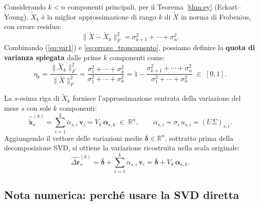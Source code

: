 \documentclass[11pt,a4paper]{article}
\theoremstyle{plain}
\theoremstyle{definition}
\theoremstyle{remark}
\begin{document}
Considerando $k < n$ componenti principali, per il Teorema~\ref{thm:ey}
(Eckart--Young), $\tilde{X}_k$ è la miglior
approssimazione di rango $k$ di $\tilde{X}$ in norma di Frobenius, con
errore residuo:
\begin{equation}
  \|\tilde{X} - \tilde{X}_k\|_F^2
  = \sigma_{k+1}^2 + \cdots + \sigma_n^2.
  \label{eq:errore_troncamento}
\end{equation}
Combinando (\ref{eq:var1}) e \eqref{eq:errore_troncamento}, possiamo definire la \textbf{quota di
varianza spiegata} dalle prime $k$ componenti come:
\begin{equation}
  \eta_k
  = \frac{\|\tilde{X}_k\|_F^2}{\|\tilde{X}\|_F^2}
  = \frac{\sigma_1^2 + \cdots + \sigma_k^2}{\sigma_1^2 + \cdots + \sigma_n^2}
  = 1 - \frac{\sigma_{k+1}^2 + \cdots + \sigma_n^2}{\sigma_1^2 + \cdots + \sigma_n^2}
  \;\in\; [0,1].
  \label{eq:varianza_spiegata}
\end{equation}

La $s$-esima riga di $\tilde{X}_k$ fornisce l'approssimazione centrata
della variazione del mese $s$ con sole $k$ componenti:
\begin{equation}
  \hat{\tilde{\mathbf{x}}}_s^{(k)}
  = \sum_{i=1}^{k} \alpha_{s,i}\,\mathbf{v}_i
  = V_k\,\boldsymbol{\alpha}_{s,k}
  \;\in\; \mathbb{R}^n,
  \qquad
  \alpha_{s,i} = \sigma_i\,u_{s,i} = (U\Sigma)_{s,i}.
  \label{eq:ric_mese_centrata}
\end{equation}
Aggiungendo il vettore delle variazioni medie $\bar{\boldsymbol{\delta}} \in \mathbb{R}^n$,
sottratto prima della decomposizione SVD, si ottiene la variazione ricostruita nella scala originale:
\begin{equation}
  \widehat{\Delta\mathbf{r}}_s^{(k)}
  = \bar{\boldsymbol{\delta}}
  + \sum_{i=1}^{k} \alpha_{s,i}\,\mathbf{v}_i
  = \bar{\boldsymbol{\delta}} + V_k\,\boldsymbol{\alpha}_{s,k}.
  \label{eq:ric_mese_originale}
\end{equation}

\subsection{Nota numerica: perché usare la SVD diretta}
\end{document}
